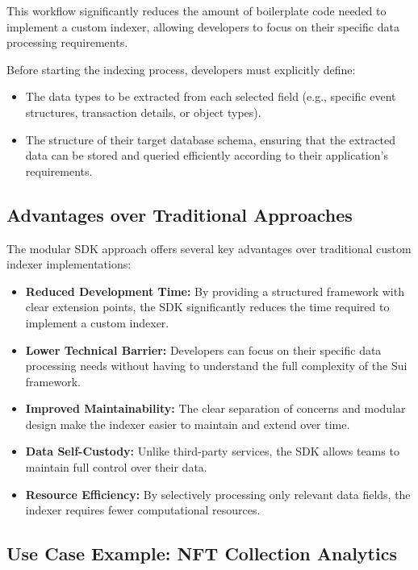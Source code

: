 This workflow significantly reduces the amount of boilerplate code needed to implement a custom indexer, allowing developers to focus on their specific data processing requirements.

Before starting the indexing process, developers must explicitly define:
\begin{itemize}
    \item The data types to be extracted from each selected field (e.g., specific event structures, transaction details, or object types).
    \item The structure of their target database schema, ensuring that the extracted data can be stored and queried efficiently according to their application's requirements.
\end{itemize}

\subsection{Advantages over Traditional Approaches}

The modular SDK approach offers several key advantages over traditional custom indexer implementations:

\begin{itemize}
    \item \textbf{Reduced Development Time:} By providing a structured framework with clear extension points, the SDK significantly reduces the time required to implement a custom indexer.
    
    \item \textbf{Lower Technical Barrier:} Developers can focus on their specific data processing needs without having to understand the full complexity of the Sui framework.
    
    \item \textbf{Improved Maintainability:} The clear separation of concerns and modular design make the indexer easier to maintain and extend over time.
    
    \item \textbf{Data Self-Custody:} Unlike third-party services, the SDK allows teams to maintain full control over their data.
    
    \item \textbf{Resource Efficiency:} By selectively processing only relevant data fields, the indexer requires fewer computational resources.
\end{itemize}

\subsection{Use Case Example: NFT Collection Analytics}

